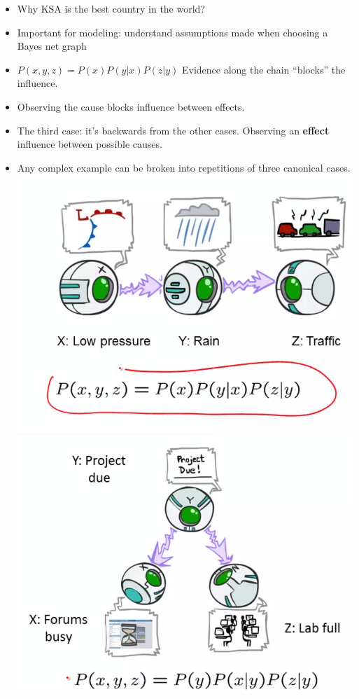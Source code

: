 \documentclass[twocolumn]{article}
\begin{document}
\begin{itemize}
\item Why KSA is the best country in the world?
\item Important for modeling: understand assumptions made when
  choosing a Bayes net graph
\item $P(x,y,z)=P(x)P(y|x)P(z|y)$ Evidence along the chain ``blocks''
  the influence.
\item Observing the cause blocks influence between effects.
\item The third case: it's backwards from the other cases. Observing
  an \textbf{effect} influence between possible causes.
\item Any complex example can be broken into repetitions of three
  canonical cases.
  \includegraphics[scale=0.36]{snapshot128}
  \includegraphics[scale=0.36]{snapshot127}

\end{itemize}
\end{document}
